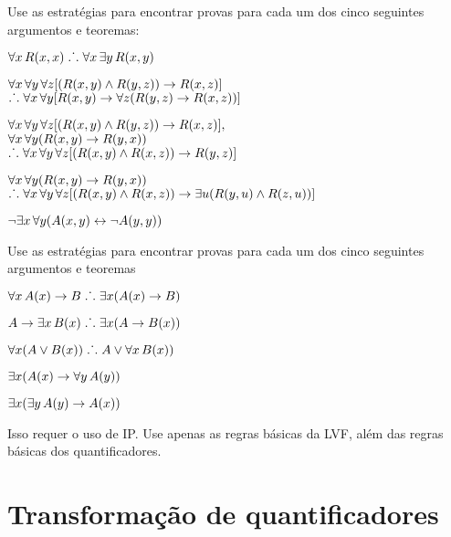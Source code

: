 \problempart
Use as estrat\'egias para encontrar provas para cada um dos cinco seguintes argumentos e teoremas:
\begin{earg}
\item $\forall x\,\mathord{R}(x,x) \mathrel{\ldotp\dot{}\,\ldotp} \forall x\,\exists y\,\mathord{R}(x,y)$
\item $\forall x\,\forall y\,\forall z[(\mathord{R}(x,y) \wedge \mathord{R}(y,z)) \rightarrow \mathord{R}(x,z)]$ \\
$\mathrel{\ldotp\dot{}\,\ldotp} \forall x\,\forall y[\mathord{R}(x,y) \rightarrow \forall z(\mathord{R}(y,z) \rightarrow \mathord{R}(x,z))]$
\item $\forall x\,\forall y\,\forall z[(\mathord{R}(x,y) \wedge \mathord{R}(y,z)) \rightarrow \mathord{R}(x,z)],$\\ $\forall x\,\forall y(\mathord{R}(x,y) \rightarrow \mathord{R}(y, x))$ \\ $\mathrel{\ldotp\dot{}\,\ldotp} \forall x\,\forall y\,\forall z[(\mathord{R}(x,y) \wedge \mathord{R}(x,z)) \rightarrow \mathord{R}(y,z)]$
\item $\forall x\,\forall y(\mathord{R}(x,y) \rightarrow \mathord{R}(y, x))$ \\$\mathrel{\ldotp\dot{}\,\ldotp} \forall x\,\forall y\,\forall z[(\mathord{R}(x,y) \wedge \mathord{R}(x,z)) \rightarrow \exists u(\mathord{R}(y,u) \wedge \mathord{R}(z,u))]$
\item $\neg \exists x\,\forall y (\mathord{A}(x, y) \leftrightarrow \lnot\mathord{A}(y, y))$
\end{earg}

\problempart
Use as estrat\'egias para encontrar provas para cada um dos cinco seguintes argumentos e teoremas
\begin{earg}
\item $\forall x\,\mathord{A}(x) \rightarrow B \mathrel{\ldotp\dot{}\,\ldotp} \exists x(\mathord{A}(x) \rightarrow B)$
\item $A \rightarrow \exists x\, \mathord{B}(x) \mathrel{\ldotp\dot{}\,\ldotp} \exists x(A \rightarrow \mathord{B}(x))$
\item $\forall x(A \vee \mathord{B}(x)) \mathrel{\ldotp\dot{}\,\ldotp} A \vee \forall x\,\mathord{B}(x))$
\item $\exists x(\mathord{A}(x) \rightarrow \forall y\,\mathord{A}(y))$
\item $\exists x(\exists y\,\mathord{A}(y) \rightarrow \mathord{A}(x))$
\end{earg}
Isso requer o uso de IP. Use apenas as regras b\'asicas da LVF, al\'em das regras b\'asicas dos quantificadores.


\chapter{Transforma\c c\~ao de quantificadores}\label{s:CQ}

